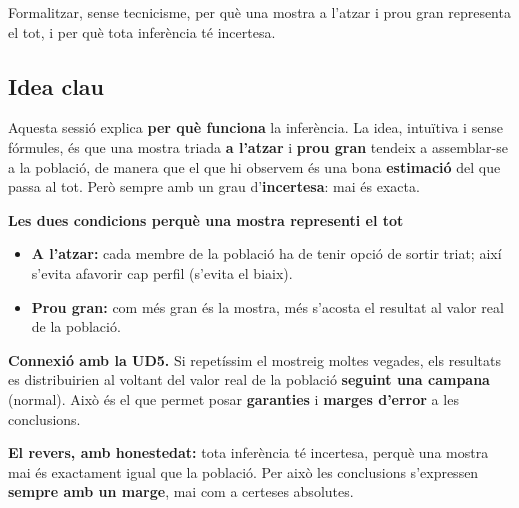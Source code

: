 %
{Formalitzar, sense tecnicisme, per què una mostra a l'atzar i prou gran representa el tot, i per què tota inferència té incertesa.}

\subsection{Idea clau}

Aquesta sessió explica \textbf{per què funciona} la inferència. La idea, intuïtiva i sense
fórmules, és que una mostra triada \textbf{a l'atzar} i \textbf{prou gran} tendeix a
assemblar-se a la població, de manera que el que hi observem és una bona
\textbf{estimació} del que passa al tot. Però sempre amb un grau d'\textbf{incertesa}: mai
és exacta.

\begin{idea}
\textbf{Les dues condicions perquè una mostra representi el tot}
\begin{itemize}[leftmargin=1.4em, itemsep=2pt]
  \item \textbf{A l'atzar:} cada membre de la població ha de tenir opció de sortir triat;
        així s'evita afavorir cap perfil (s'evita el biaix).
  \item \textbf{Prou gran:} com més gran és la mostra, més s'acosta el resultat al valor
        real de la població.
\end{itemize}
\textbf{Connexió amb la UD5.} Si repetíssim el mostreig moltes vegades, els resultats es
distribuirien al voltant del valor real de la població \textbf{seguint una campana}
(normal). Això és el que permet posar \textbf{garanties} i \textbf{marges d'error} a les
conclusions.
\smallskip

\noindent\textbf{El revers, amb honestedat:} tota inferència té incertesa, perquè una
mostra mai és exactament igual que la població. Per això les conclusions s'expressen
\textbf{sempre amb un marge}, mai com a certeses absolutes.
\end{idea}

